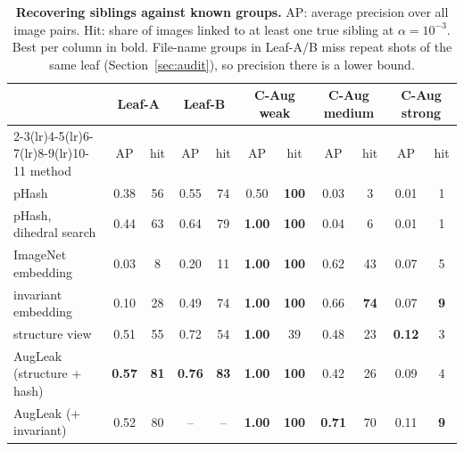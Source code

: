 \begin{table}[t]
\centering\small
\setlength{\tabcolsep}{4pt}
\caption{\textbf{Recovering siblings against known groups.} AP: average precision over all image pairs. Hit: share of images linked to at least one true sibling at $\alpha=10^{-3}$. Best per column in bold. File-name groups in Leaf-A/B miss repeat shots of the same leaf (Section~\ref{sec:audit}), so precision there is a lower bound.}
\label{tab:detect}
\begin{tabular}{@{}lcccccccccc@{}}
\toprule
 & \multicolumn{2}{c}{Leaf-A} & \multicolumn{2}{c}{Leaf-B} & \multicolumn{2}{c}{C-Aug weak} & \multicolumn{2}{c}{C-Aug medium} & \multicolumn{2}{c}{C-Aug strong} \\
\cmidrule(lr){2-3}\cmidrule(lr){4-5}\cmidrule(lr){6-7}\cmidrule(lr){8-9}\cmidrule(lr){10-11}
method & AP & hit & AP & hit & AP & hit & AP & hit & AP & hit \\
\midrule
pHash & 0.38 & 56 & 0.55 & 74 & 0.50 & \textbf{100} & 0.03 & 3 & 0.01 & 1 \\
pHash, dihedral search & 0.44 & 63 & 0.64 & 79 & \textbf{1.00} & \textbf{100} & 0.04 & 6 & 0.01 & 1 \\
ImageNet embedding & 0.03 & 8 & 0.20 & 11 & \textbf{1.00} & \textbf{100} & 0.62 & 43 & 0.07 & 5 \\
invariant embedding & 0.10 & 28 & 0.49 & 74 & \textbf{1.00} & \textbf{100} & 0.66 & \textbf{74} & 0.07 & \textbf{9} \\
structure view & 0.51 & 55 & 0.72 & 54 & \textbf{1.00} & 39 & 0.48 & 23 & \textbf{0.12} & 3 \\
AugLeak (structure + hash) & \textbf{0.57} & \textbf{81} & \textbf{0.76} & \textbf{83} & \textbf{1.00} & \textbf{100} & 0.42 & 26 & 0.09 & 4 \\
AugLeak (+ invariant) & 0.52 & 80 & -- & -- & \textbf{1.00} & \textbf{100} & \textbf{0.71} & 70 & 0.11 & \textbf{9} \\
\bottomrule
\end{tabular}
\end{table}
